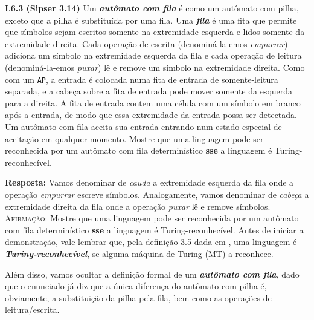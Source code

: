 
\noindent \textbf{L6.3 (Sipser 3.14)} Um \textbf{\textit{autômato com fila}} é como um autômato com pilha, exceto que a pilha é substituída por uma fila. Uma \textbf{\textit{fila}} é uma fita que permite que símbolos sejam escritos somente na extremidade esquerda e lidos somente da extremidade direita. Cada operação de escrita (denominá-la-emos  \textit{empurrar}) adiciona um símbolo na extremidade esquerda da fila e cada operação de leitura (denominá-la-emos  \textit{puxar}) lê e remove um símbolo na extremidade direita. Como com um \texttt{AP}, a entrada é colocada numa fita de entrada de somente-leitura separada, e a cabeça sobre a fita de entrada pode mover somente da esquerda para a direita. A fita de entrada contem uma célula com um símbolo em branco após a entrada, de modo que essa extremidade da entrada possa ser detectada. Um autômato com fila aceita sua entrada entrando num estado especial de aceitação em qualquer momento. Mostre que uma linguagem pode ser reconhecida por um autômato com fila determinístico \textbf{sse} a linguagem é Turing-reconhecível.

\textbf{Resposta: } Vamos denominar de \textit{cauda} a extremidade esquerda da fila onde a operação \textit{empurrar} escreve símbolos. Analogamente, vamos denominar de \textit{cabeça} a extremidade direita da fila onde a operação \textit{puxar} lê e remove símbolos.
\vskip 0.2in
\textsc{Afirmação:} Mostre que uma linguagem pode ser reconhecida por um autômato com fila determinístico \textbf{sse} a linguagem é Turing-reconhecível.
\vskip 0.2in
Antes de iniciar a demonstração, vale lembrar que, pela definição 3.5 dada em \cite{sipser:2006}, uma linguagem é \textit{\textbf{Turing-reconhecível}}, se alguma máquina de Turing (MT) a reconhece.

Além disso, vamos ocultar a definição formal de um \textit{\textbf{autômato com fila}}, dado que o enunciado já diz que a única diferença do autômato com pilha é, obviamente, a substituição da pilha pela fila, bem como as operações de leitura/escrita.


